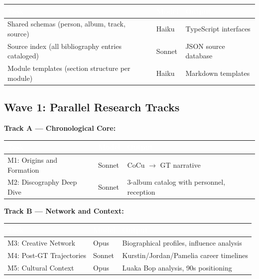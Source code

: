 \documentclass[11pt,letterpaper]{article}
\newcommand{\tableheader}[1]{\textbf{\sffamily\textcolor{white}{#1}}}
\begin{document}
\begin{center}
\begin{tabularx}{\textwidth}{L{3.5cm}C{1.5cm}X}
\toprule
{}
\tableheader{Task} & \tableheader{Model} & \tableheader{Output} \\
\midrule
Shared schemas (person, album, track, source) & Haiku & TypeScript interfaces \\
Source index (all bibliography entries cataloged) & Sonnet & JSON source database \\
Module templates (section structure per module) & Haiku & Markdown templates \\
\bottomrule
\end{tabularx}
\end{center}

\subsection{Wave 1: Parallel Research Tracks}

\textbf{Track A --- Chronological Core:}

\begin{center}
\begin{tabularx}{\textwidth}{L{3.5cm}C{1.5cm}X}
\toprule
{}
\tableheader{Task} & \tableheader{Model} & \tableheader{Output} \\
\midrule
M1: Origins and Formation & Sonnet & CoCu $\rightarrow$ GT narrative \\
M2: Discography Deep Dive & Sonnet & 3-album catalog with personnel, reception \\
\bottomrule
\end{tabularx}
\end{center}

\textbf{Track B --- Network and Context:}

\begin{center}
\begin{tabularx}{\textwidth}{L{3.5cm}C{1.5cm}X}
\toprule
{}
\tableheader{Task} & \tableheader{Model} & \tableheader{Output} \\
\midrule
M3: Creative Network & Opus & Biographical profiles, influence analysis \\
M4: Post-GT Trajectories & Sonnet & Kurstin/Jordan/Pamelia career timelines \\
M5: Cultural Context & Opus & Luaka Bop analysis, 90s positioning \\
\bottomrule
\end{tabularx}
\end{center}
\end{document}
